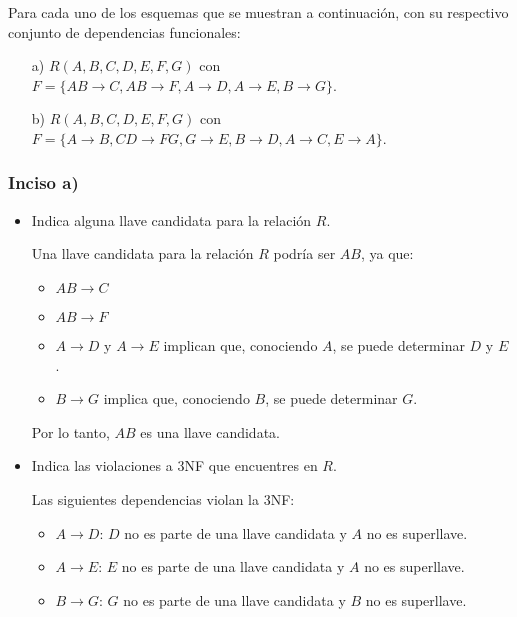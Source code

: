 Para cada uno de los esquemas que se muestran a continuación, con su respectivo conjunto de dependencias funcionales:

\begin{itemize}
	\item[a)] \( R(A, B, C, D, E, F, G) \) con \( F = \{AB \to C, AB \to F, A \to D, A \to E, B \to G\} \).
	\item[b)] \( R(A, B, C, D, E, F, G) \) con \( F = \{A \to B, CD \to FG, G \to E, B \to D, A \to C, E \to A\} \).
\end{itemize}

\subsubsection*{Inciso a)}
\begin{itemize}
	\item Indica alguna llave candidata para la relación \( R \).

		Una llave candidata para la relación \( R \) podría ser \( AB \), ya que:
		\begin{itemize}
			\item \( AB \rightarrow C \)
			\item \( AB \rightarrow F \)
			\item \( A \rightarrow D \) y \( A \rightarrow E \) implican que, conociendo \( A \), se puede determinar \( D \) y \( E \).
			\item \( B \rightarrow G \) implica que, conociendo \( B \), se puede determinar \( G \).
		\end{itemize}
		Por lo tanto, \( AB \) es una llave candidata.
	\vspace*{.3cm}
	\item Indica las violaciones a 3NF que encuentres en \( R \).
	
	Las siguientes dependencias violan la 3NF:
	\begin{itemize}
		\item \( A \rightarrow D \): \( D \) no es parte de una llave candidata y \( A \) no es superllave.
		\item \( A \rightarrow E \): \( E \) no es parte de una llave candidata y \( A \) no es superllave.
		\item \( B \rightarrow G \): \( G \) no es parte de una llave candidata y \( B \) no es superllave.
	\end{itemize}
	\vspace*{.3cm}
	

\end{itemize}
